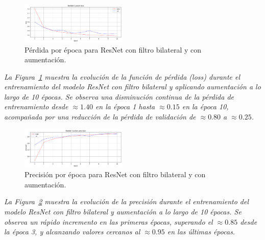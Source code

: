 \documentclass[conference]{IEEEtran}
\begin{document}
\begin{figure}[H]
    \centering
    \includegraphics[width=0.45\textwidth]{graphics-resnet-bilateral/resnet_bilateral_with_loss.png}
    \caption{Pérdida por época para ResNet con filtro bilateral y con aumentación.}
    \label{fig:resnet_bilateral_with_loss}
\end{figure}
\noindent\textit{%
La Figura~\ref{fig:resnet_bilateral_with_loss} muestra la evolución de la función de pérdida (loss) durante el entrenamiento del modelo ResNet con filtro bilateral y aplicando aumentación a lo largo de 10 épocas. Se observa una disminución continua de la pérdida de entrenamiento desde \(\approx1.40\) en la época 1 hasta \(\approx0.15\) en la época 10, acompañada por una reducción de la pérdida de validación de \(\approx0.80\) a \(\approx0.25\).
}

\begin{figure}[H]
    \centering
    \includegraphics[width=0.45\textwidth]{graphics-resnet-bilateral/resnet_bilateral_with_precision.png}
    \caption{Precisión por época para ResNet con filtro bilateral y con aumentación.}
    \label{fig:resnet_bilateral_with_precision}
\end{figure}
\noindent\textit{%
La Figura~\ref{fig:resnet_bilateral_with_precision} muestra la evolución de la precisión durante el entrenamiento del modelo ResNet con filtro bilateral y aumentación a lo largo de 10 épocas. Se observa un rápido incremento en las primeras épocas, superando el \(\approx0.85\) desde la época 3, y alcanzando valores cercanos al \(\approx0.95\) en las últimas épocas.%
}
\end{document}
